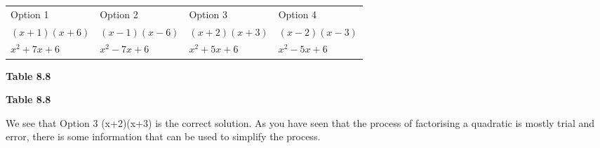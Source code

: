           \begin{table}[H]
        \begin{center}
      \label{m39394*id276265}
    \noindent
      \tablelasttail{}
      \begin{xtabular}[t]{|l|l|l|l|}\hline
        Option 1 &
        Option 2 &
        Option 3 &
        Option 4%
     \tabularnewline{}
                $\left(x+1\right)\left(x+6\right)$
               &
                $\left(x-1\right)\left(x-6\right)$
               &
                $\left(x+2\right)\left(x+3\right)$
               &
                $\left(x-2\right)\left(x-3\right)$
     \tabularnewline{}
                ${x}^{2}+7x+6$
               &
                ${x}^{2}-7x+6$
               &
                \uline{
                  ${x}^{2}+5x+6$
                }
               &
                ${x}^{2}-5x+6$
     \tabularnewline{}
    \end{xtabular}
      \end{center}
    \begin{center}{\small\bfseries Table 8.8}\end{center}
    \begin{caption}{\small\bfseries Table 8.8}\end{caption}
\end{table}
    \par
      \label{m39394*id276547}We see that Option 3 (x+2)(x+3) is the correct solution. As you have seen that the process of factorising a quadratic is mostly trial and error, there is some information that can be used to simplify the process.\par 
      \label{m39394*uid20}
